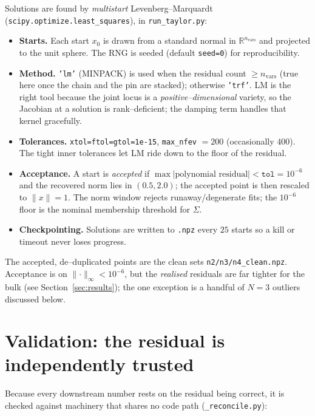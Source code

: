 \documentclass[11pt]{article}
\newcommand{\norm}[1]{\lVert #1\rVert}
\newcommand{\code}[1]{\texttt{#1}}
\begin{document}
Solutions are found by \emph{multistart} Levenberg--Marquardt
(\code{scipy.optimize.least\_squares}), in \code{run\_taylor.py}:

\begin{itemize}
\item \textbf{Starts.} Each start $x_0$ is drawn from a standard normal in
$\mathbb R^{n_{\mathrm{vars}}}$ and projected to the unit sphere. The RNG is
seeded (default \code{seed=0}) for reproducibility.
\item \textbf{Method.} \code{'lm'} (MINPACK) is used when the residual count
$\ge n_{\mathrm{vars}}$ (true here once the chain and the pin are stacked);
otherwise \code{'trf'}. LM is the right tool because the joint locus is a
\emph{positive--dimensional} variety, so the Jacobian at a solution is
rank--deficient; the damping term handles that kernel gracefully.
\item \textbf{Tolerances.} \code{xtol=ftol=gtol=1e-15}, \code{max\_nfev}
$=200$ (occasionally $400$). The tight inner tolerances let LM ride down to the
floor of the residual.
\item \textbf{Acceptance.} A start is \emph{accepted} if
$\max|\text{polynomial residual}|<\texttt{tol}=10^{-6}$ and the recovered norm
lies in $(0.5,2.0)$; the accepted point is then rescaled to
$\norm{x}=1$. The norm window rejects runaway/degenerate fits; the
$10^{-6}$ floor is the nominal membership threshold for $\Sigma$.
\item \textbf{Checkpointing.} Solutions are written to \code{.npz} every $25$
starts so a kill or timeout never loses progress.
\end{itemize}

The accepted, de--duplicated points are the clean sets
\code{n2/n3/n4\_clean.npz}. Acceptance is on $\norm{\cdot}_\infty<10^{-6}$, but
the \emph{realised} residuals are far tighter for the bulk (see
Section~\ref{sec:results}); the one exception is a handful of $N=3$ outliers
discussed below.

\section{Validation: the residual is independently trusted}
\label{sec:validation}

Because every downstream number rests on the residual being correct, it is
checked against machinery that shares no code path (\code{\_reconcile.py}):
\end{document}
